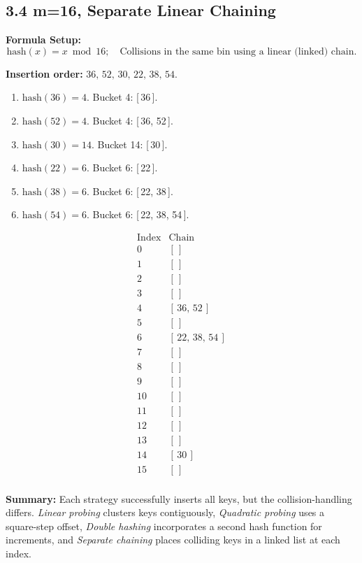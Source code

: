 \documentclass[12pt]{article}
\begin{document}
	\subsection*{3.4 m=16, Separate Linear Chaining}
	\noindent
	\textbf{Formula Setup:} 
	\[
	\text{hash}(x) = x \bmod 16;
	\quad
	\text{Collisions in the same bin using a linear (linked) chain}.
	\]
	
	\noindent
	\textbf{Insertion order:} \(36,\,52,\,30,\,22,\,38,\,54\). 
	\begin{enumerate}
		\item \(\text{hash}(36) = 4.\) Bucket 4: [\,36\,].
		\item \(\text{hash}(52) = 4.\) Bucket 4: [\,36, 52\,].
		\item \(\text{hash}(30) = 14.\) Bucket 14: [\,30\,].
		\item \(\text{hash}(22) = 6.\) Bucket 6: [\,22\,].
		\item \(\text{hash}(38) = 6.\) Bucket 6: [\,22, 38\,].
		\item \(\text{hash}(54) = 6.\) Bucket 6: [\,22, 38, 54\,].
	\end{enumerate}
	
	\[
	\begin{array}{c|l}
		\text{Index} & \text{Chain} \\
		\hline
		0 & [\,] \\
		1 & [\,] \\
		2 & [\,] \\
		3 & [\,] \\
		4 & [\,36,\,52\,] \\
		5 & [\,] \\
		6 & [\,22,\,38,\,54\,] \\
		7 & [\,] \\
		8 & [\,] \\
		9 & [\,] \\
		10 & [\,] \\
		11 & [\,] \\
		12 & [\,] \\
		13 & [\,] \\
		14 & [\,30\,] \\
		15 & [\,] \\
	\end{array}
	\]
	
	\vspace{1em}
	\noindent
	\textbf{Summary:} 
	Each strategy successfully inserts all keys, but the collision-handling differs. 
	\emph{Linear probing} clusters keys contiguously, 
	\emph{Quadratic probing} uses a square-step offset, 
	\emph{Double hashing} incorporates a second hash function for increments, 
	and 
	\emph{Separate chaining} places colliding keys in a linked list at each index.
	
\end{document}
